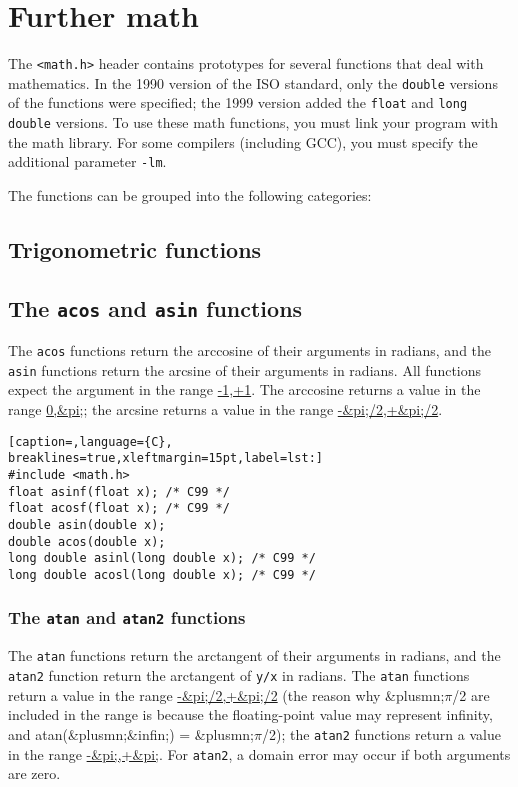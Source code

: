 \section{Further math}
The \texttt{\textless{}math.h\textgreater{}} header contains prototypes for
several functions that deal with mathematics. In the 1990 version of the ISO
standard, only the \texttt{double} versions of the functions were specified;
the 1999 version added the \texttt{float} and \texttt{long double} versions. To
use these math functions, you must link your program with the math library. For
some compilers (including GCC), you must specify the additional parameter
\texttt{-lm}.

The functions can be grouped into the following categories:
\subsection{Trigonometric functions}
\subsection{The \texttt{acos} and \texttt{asin} functions}
The \texttt{acos} functions return the arccosine of their arguments in radians,
and the \texttt{asin} functions return the arcsine of their arguments in
radians. All functions expect the argument in the range \url{-1,+1}. The
arccosine returns a value in the range \url{0,&pi;}; the arcsine returns a
value in the range \url{-&pi;/2,+&pi;/2}.

\lstset{basicstyle=\scriptsize, numbers=left, captionpos=b, tabsize=4}
\begin{lstlisting}[caption=,language={C},
breaklines=true,xleftmargin=15pt,label=lst:]
#include <math.h>
float asinf(float x); /* C99 */
float acosf(float x); /* C99 */
double asin(double x);
double acos(double x);
long double asinl(long double x); /* C99 */
long double acosl(long double x); /* C99 */
\end{lstlisting}

\subsubsection{The \texttt{atan} and \texttt{atan2} functions}
The \texttt{atan} functions return the arctangent of their arguments in
radians, and the \texttt{atan2} function return the arctangent of \texttt{y/x}
in radians. The \texttt{atan} functions return a value in the range
\url{-&pi;/2,+&pi;/2} (the reason why \&plusmn;\ensuremath{\pi}/2 are included
in the range is because the floating-point value may represent infinity, and
atan(\&plusmn;\&infin;) = \&plusmn;\ensuremath{\pi}/2); the \texttt{atan2}
functions return a value in the range \url{-&pi;,+&pi;}. For \texttt{atan2}, a
domain error may occur if both arguments are zero.

